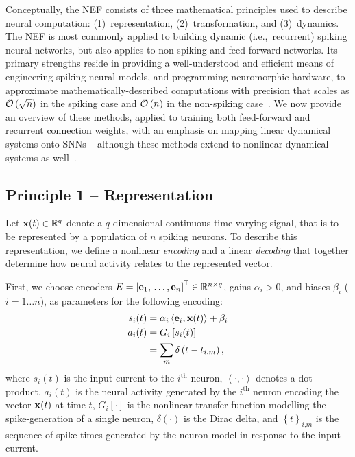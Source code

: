 Conceptually, the NEF consists of three mathematical principles used to describe neural computation: (1)~representation, (2)~transformation, and (3)~dynamics.
The NEF is most commonly applied to building dynamic (i.e.,~recurrent) spiking neural networks, but also applies to non-spiking and feed-forward networks.
Its primary strengths reside in providing a well-understood and efficient means of engineering spiking neural models, and programming neuromorphic hardware, to approximate mathematically-described computations with precision that scales as $\mathcal{O}\left({\sqrt{n}}\right)$ in the spiking case and $\mathcal{O}\left({n}\right)$ in the non-spiking case~\citep{eliasmith2003a, boahen2017neuromorph}.
We now provide an overview of these methods, applied to training both feed-forward and recurrent connection weights, with an emphasis on mapping linear dynamical systems onto SNNs -- although these methods extend to nonlinear dynamical systems as well~\citep{voelker2017iscas, voelker2017neuromorphic}.

\subsection{Principle 1 -- Representation}
\label{sec:principle1}

Let $\mathbf{x}(t) \in \mathbb{R}^q$ denote a $q$-dimensional continuous-time varying signal, that is to be represented by a population of $n$ spiking neurons.
To describe this representation, we define a nonlinear \emph{encoding} and a linear \emph{decoding} that together determine how neural activity relates to the represented vector.

First, we choose encoders $E = {\left[ \mathbf{e}_1\text{,}\, \ldots\text{,}\, \mathbf{e}_n \right]}^\mathsf{T} \in \mathbb{R}^{n \times q}$, gains $\alpha_i > 0$, and biases $\beta_i$ ($i = 1 \ldots n$), as parameters for the following encoding:
\begin{equation}
\begin{aligned} \label{eq:encoding}
s_i(t) &= \alpha_i \left\langle \mathbf{e}_i\text{,}\, \mathbf{x}(t) \right\rangle + \beta_i \\
a_i(t) &= G_i \left[ s_i(t) \right] \\
&= \sum_m \delta \left(t - t_{i\text{,}m} \right) \text{,}
\end{aligned}
\end{equation}
where $s_i(t)$ is the input current to the $i^\text{th}$ neuron, $\left\langle \cdot , \cdot \right\rangle$ denotes a dot-product,
$a_i(t)$ is the neural activity generated by the $i^{\text{th}}$ neuron encoding the vector $\mathbf{x}(t)$ at time $t$, $G_i \left[ \cdot \right]$ is the nonlinear transfer function modelling the spike-generation of a single neuron,
$\delta(\cdot)$ is the Dirac delta, and $\left\{ t \right\}_{i\text{,}m}$ is the sequence of spike-times generated by the neuron model in response to the input current.

